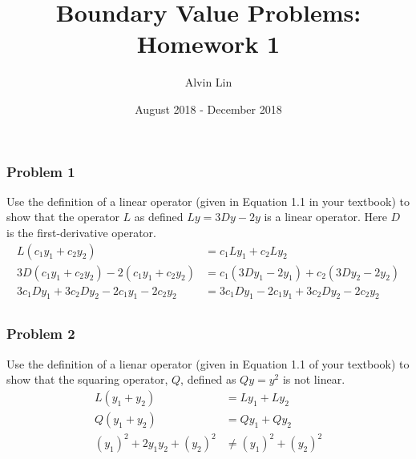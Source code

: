 \documentclass{math}
\title{Boundary Value Problems: Homework 1}
\author{Alvin Lin}
\date{August 2018 - December 2018}
\begin{document}
\maketitle

\subsubsection*{Problem 1}
Use the definition of a linear operator (given in Equation 1.1 in your textbook)
to show that the operator \( L \) as defined \( Ly = 3Dy-2y \) is a linear
operator. Here \( D \) is the first-derivative operator.
\begin{align*}
  L(c_1y_1+c_2y_2) &= c_1Ly_1+c_2Ly_2 \\
  3D(c_1y_1+c_2y_2)-2(c_1y_1+c_2y_2) &= c_1(3Dy_1-2y_1)+c_2(3Dy_2-2y_2) \\
  3c_1Dy_1+3c_2Dy_2-2c_1y_1-2c_2y_2 &= 3c_1Dy_1-2c_1y_1+3c_2Dy_2-2c_2y_2 \\
\end{align*}

\subsubsection*{Problem 2}
Use the definition of a lienar operator (given in Equation 1.1 of your textbook)
to show that the squaring operator, \( Q \), defined as \( Qy = y^2 \) is not
linear.
\begin{align*}
  L(y_1+y_2) &= Ly_1+Ly_2 \\
  Q(y_1+y_2) &= Qy_1+Qy_2 \\
  (y_1)^2+2y_1y_2+(y_2)^2 &\ne (y_1)^2+(y_2)^2 \\
\end{align*}
\end{document}
